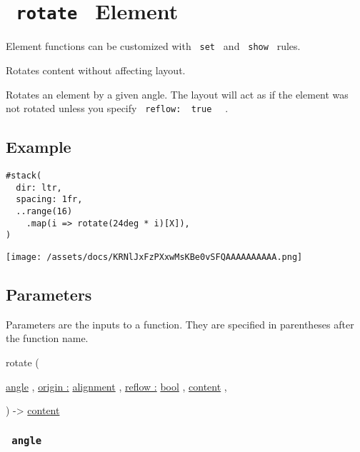 \section{\texorpdfstring{\texttt{\ rotate\ } {{ Element
}}}{ rotate   Element }}\label{summary}

\label{element-tooltip}
Element functions can be customized with \texttt{\ set\ } and
\texttt{\ show\ } rules.

Rotates content without affecting layout.

Rotates an element by a given angle. The layout will act as if the
element was not rotated unless you specify
\texttt{\ reflow:\ }{\texttt{\ true\ }}\texttt{\ } .

\subsection{Example}\label{example}

\begin{verbatim}
#stack(
  dir: ltr,
  spacing: 1fr,
  ..range(16)
    .map(i => rotate(24deg * i)[X]),
)
\end{verbatim}

\texttt{[image: /assets/docs/KRNlJxFzPXxwMsKBe0vSFQAAAAAAAAAA.png]}

\subsection{\texorpdfstring{{ Parameters
}}{ Parameters }}\label{parameters}

\label{parameters-tooltip}
Parameters are the inputs to a function. They are specified in
parentheses after the function name.

{ rotate } (

{ \hyperref[parameters-angle]{}
\href{/docs/reference/layout/angle/}{angle} , } {
\hyperref[parameters-origin]{origin :}
\href{/docs/reference/layout/alignment/}{alignment} , } {
\hyperref[parameters-reflow]{reflow :}
\href{/docs/reference/foundations/bool/}{bool} , } {
\href{/docs/reference/foundations/content/}{content} , }

) -\textgreater{} \href{/docs/reference/foundations/content/}{content}

\subsubsection{\texorpdfstring{\texttt{\ angle\ }}{ angle }}\label{parameters-angle}

